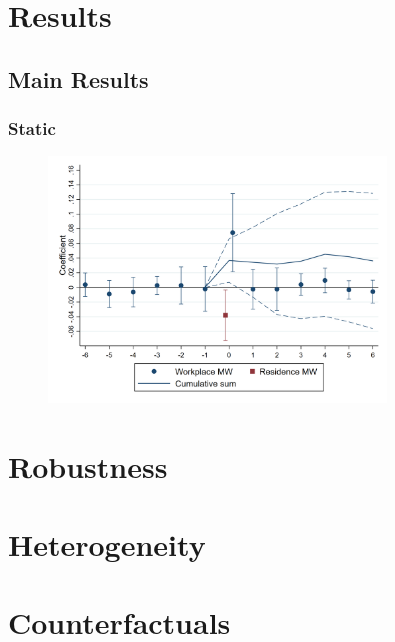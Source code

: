 \documentclass[aspectratio=169]{beamer}
\begin{document}
\section{Results}

\subsection{Main Results}

\begin{frame}
    \frametitle{Static }
    
\end{frame}

\begin{frame}
	\begin{figure}
		\centering
		\vspace{-2mm}
		\includegraphics[width=0.8\textwidth]{fd_baseline/output/fd_baseline_exp_ln_mw_17_dynamic.png}
	\end{figure}   
\end{frame}


\section{Robustness}

\section{Heterogeneity}

\section{Counterfactuals}
\end{document}
